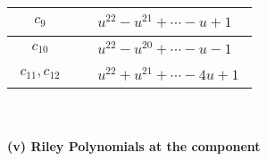 \documentclass[1p]{elsarticle_modified}
\theoremstyle{definition}
\begin{document}
\begin{tabular}{m{50pt}|m{274pt}}
\hline $$\begin{aligned}c_{9}\end{aligned}$$&$\begin{aligned}
&u^{22}- u^{21}+\cdots- u+1
\end{aligned}$\\
\hline $$\begin{aligned}c_{10}\end{aligned}$$&$\begin{aligned}
&u^{22}- u^{20}+\cdots- u-1
\end{aligned}$\\
\hline $$\begin{aligned}c_{11},c_{12}\end{aligned}$$&$\begin{aligned}
&u^{22}+u^{21}+\cdots-4 u+1
\end{aligned}$\\
\hline
\end{tabular}\\~\\
\newpage\renewcommand{\arraystretch}{1}
\flushleft \textbf{(v) Riley Polynomials at the component}\newline \\
\end{document}
